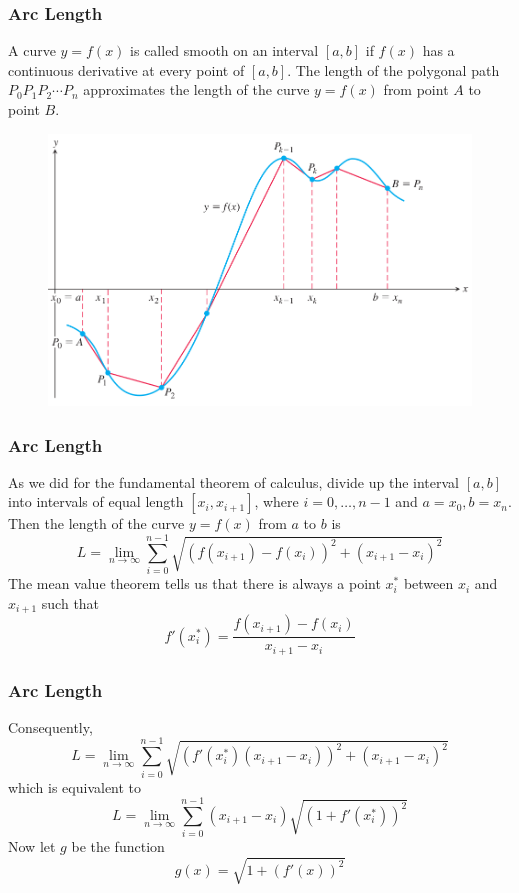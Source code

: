 \documentclass[xcolor=dvipsnames]{beamer}
\begin{document}
\begin{frame}
  \frametitle{Arc Length}
  A curve $y=f(x)$ is called \alert{smooth} on an interval $[a,b]$ if
  $f(x)$ has a continuous derivative at every point of $[a,b]$. The
  length of the polygonal path $P_{0}P_{1}P_{2}\cdots{}P_{n}$
  approximates the length of the curve $y=f(x)$ from point $A$ to
  point $B$.
  \begin{figure}[h]
    \includegraphics[scale=0.25]{./pollen.png}
  \end{figure}
  \end{frame}

\begin{frame}
  \frametitle{Arc Length}
  As we did for the fundamental theorem of calculus, divide up the
  interval $[a,b]$ into intervals of equal length $[x_{i},x_{i+1}]$,
  where $i=0,\ldots,n-1$ and $a=x_{0},b=x_{n}$. Then the length of the
  curve $y=f(x)$ from $a$ to $b$ is
  \begin{equation}
    \label{eq:eeyohpha}
    L=\lim_{n\rightarrow\infty}\sum_{i=0}^{n-1}\sqrt{\left(f(x_{i+1})-f(x_{i})\right)^{2}+\left(x_{i+1}-x_{i}\right)^{2}}
  \end{equation}
The mean value theorem tells us that there is always a point
$x_{i}^{\ast}$ between $x_{i}$ and $x_{i+1}$ such that
\begin{equation}
  \label{eq:oshachie}
  f'(x_{i}^{\ast})=\frac{f(x_{i+1})-f(x_{i})}{x_{i+1}-x_{i}}
\end{equation}
\end{frame}

\begin{frame}
  \frametitle{Arc Length}
Consequently,
  \begin{equation}
    \label{eq:ahchoode}
    L=\lim_{n\rightarrow\infty}\sum_{i=0}^{n-1}\sqrt{\left(f'(x_{i}^{\ast})\left(x_{i+1}-x_{i}\right)\right)^{2}+\left(x_{i+1}-x_{i}\right)^{2}}
  \end{equation}
which is equivalent to
\begin{equation}
  \label{eq:jooquaiw}
    L=\lim_{n\rightarrow\infty}\sum_{i=0}^{n-1}\left(x_{i+1}-x_{i}\right)\sqrt{\left(1+f'(x_{i}^{\ast})\right)^{2}}
\end{equation}
Now let $g$ be the function
\begin{equation}
  \label{eq:eicahdei}
  g(x)=\sqrt{1+\left(f'(x)\right)^{2}}
\end{equation}
\end{frame}
\end{document}
